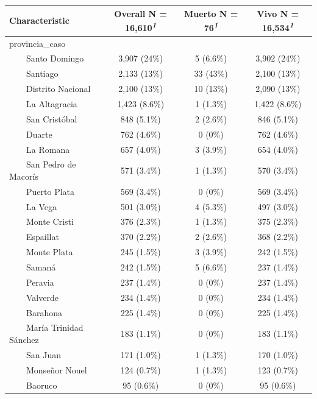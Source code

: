 \documentclass[
  letterpaper,
  DIV=11,
  numbers=noendperiod]{scrreprt}
\begin{document}
\begin{table}
\fontsize{12.0pt}{14.4pt}\selectfont
\begin{tabular*}{\linewidth}{@{\extracolsep{\fill}}lccc}
\toprule
\textbf{Characteristic} & \textbf{Overall}  N = 16,610\textsuperscript{\textit{1}} & \textbf{Muerto}  N = 76\textsuperscript{\textit{1}} & \textbf{Vivo}  N = 16,534\textsuperscript{\textit{1}} \\ 
\midrule\addlinespace[2.5pt]
provincia\_caso &  &  &  \\ 
    Santo Domingo & 3,907 (24\%) & 5 (6.6\%) & 3,902 (24\%) \\ 
    Santiago & 2,133 (13\%) & 33 (43\%) & 2,100 (13\%) \\ 
    Distrito Nacional & 2,100 (13\%) & 10 (13\%) & 2,090 (13\%) \\ 
    La Altagracia & 1,423 (8.6\%) & 1 (1.3\%) & 1,422 (8.6\%) \\ 
    San Cristóbal & 848 (5.1\%) & 2 (2.6\%) & 846 (5.1\%) \\ 
    Duarte & 762 (4.6\%) & 0 (0\%) & 762 (4.6\%) \\ 
    La Romana & 657 (4.0\%) & 3 (3.9\%) & 654 (4.0\%) \\ 
    San Pedro de Macorís & 571 (3.4\%) & 1 (1.3\%) & 570 (3.4\%) \\ 
    Puerto Plata & 569 (3.4\%) & 0 (0\%) & 569 (3.4\%) \\ 
    La Vega & 501 (3.0\%) & 4 (5.3\%) & 497 (3.0\%) \\ 
    Monte Cristi & 376 (2.3\%) & 1 (1.3\%) & 375 (2.3\%) \\ 
    Espaillat & 370 (2.2\%) & 2 (2.6\%) & 368 (2.2\%) \\ 
    Monte Plata & 245 (1.5\%) & 3 (3.9\%) & 242 (1.5\%) \\ 
    Samaná & 242 (1.5\%) & 5 (6.6\%) & 237 (1.4\%) \\ 
    Peravia & 237 (1.4\%) & 0 (0\%) & 237 (1.4\%) \\ 
    Valverde & 234 (1.4\%) & 0 (0\%) & 234 (1.4\%) \\ 
    Barahona & 225 (1.4\%) & 0 (0\%) & 225 (1.4\%) \\ 
    María Trinidad Sánchez & 183 (1.1\%) & 0 (0\%) & 183 (1.1\%) \\ 
    San Juan & 171 (1.0\%) & 1 (1.3\%) & 170 (1.0\%) \\ 
    Monseñor Nouel & 124 (0.7\%) & 1 (1.3\%) & 123 (0.7\%) \\ 
    Baoruco & 95 (0.6\%) & 0 (0\%) & 95 (0.6\%) \\ 

\end{tabular*}
\end{table}
\end{document}

